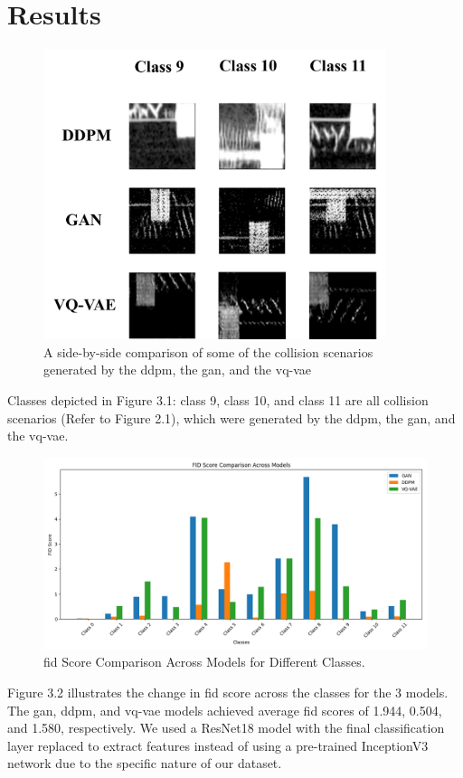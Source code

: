 \chapter{Results}
\label{chap:results}
\begin{figure}[h!]
\includegraphics[width=10cm]{figures/Picture7.png}
\centering
\caption{A side-by-side comparison of some of the collision scenarios generated by the \gls{ddpm}, the \gls{gan}, and the \gls{vq-vae} }
\centering
\end{figure}

Classes depicted in Figure 3.1: class 9, class 10, and class 11 are all collision scenarios (Refer to Figure 2.1), which were generated by the \gls{ddpm}, the \gls{gan}, and the \gls{vq-vae}. 

\begin{figure}[ht]
    \centering
    \includegraphics[width=\textwidth]{figures/Figure_12.png} 
    \caption{\gls{fid} Score Comparison Across Models for Different Classes.}
    \label{fig:fid_scores}
\end{figure}
Figure 3.2 illustrates the change in \gls{fid} score across the classes for the 3 models.  The \gls{gan}, \gls{ddpm}, and \gls{vq-vae} models achieved average \gls{fid} scores of 1.944, 0.504, and 1.580, respectively. We used a ResNet18 model with the final classification layer replaced to extract features instead of using a pre-trained InceptionV3 network due to the specific nature of our dataset.

